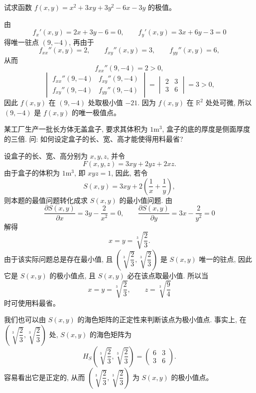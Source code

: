 \documentclass[12pt,fontset=fandol]{ctexart}
\begin{document}
\begin{example}\label{course-example-14-5-1}\quad 试求函数 $f(x,y)=x^2+3xy+3y^2-6x-3y$ 的极值。

\end{example}
\begin{solve}\quad 由
\[
  f_x'(x,y)=2x+3y-6=0,\qquad
  f_y'(x,y)=3x+6y-3=0
\]
得唯一驻点 $(9,-4)$, 再由于
\[
  f_{xx}''(x,y)=2,\qquad f_{xy}''(x,y)=3,\qquad f_{yy}''(x,y)=6,
\]
从而
\[
  f_{xx}''(9,-4)=2>0,
\]
\[
  \begin{vmatrix}
    f_{xx}''(9,-4) & f_{xy}''(9,-4)\\
    f_{xy}''(9,-4) & f_{yy}''(9,-4)
  \end{vmatrix}
  =
  \begin{vmatrix}
    2 & 3\\
    3 & 6
  \end{vmatrix}
  =3>0,
\]
因此 $f(x,y)$ 在 $(9,-4)$ 处取极小值 $-21$. 因为 $f(x,y)$ 在 $\mathbb R^2$ 处处可微, 所以 $(9,-4)$ 是 $f(x,y)$ 的唯一极值点。

\end{solve}
\begin{example}\label{course-example-14-5-2}\quad 某工厂生产一批长方体无盖盒子, 要求其体积为 $1\mathrm{m}^3$, 盒子的底的厚度是侧面厚度的三倍. 问: 如何设定盒子的长、宽、高才能使得用料最省?

\end{example}
\begin{solve}\quad 设盒子的长、宽、高分别为 $x,y,z$, 并令
\[
  F(x,y,z)=3xy+2yz+2xz.
\]
由于盒子的体积为 $1\mathrm{m}^3$, 即 $xyz=1$, 因此, 若令
\[
  S(x,y)=3xy+2\left(\frac1x+\frac1y\right),
\]
则本题的最值问题转化成求 $S(x,y)$ 的最小值问题. 由
\[
  \frac{\partial S(x,y)}{\partial x}=3y-\frac2{x^2}=0,\qquad
  \frac{\partial S(x,y)}{\partial y}=3x-\frac2{y^2}=0
\]
解得
\[
  x=y=\sqrt[3]{\frac23}.
\]
由于该实际问题总是存在最小值, 且 $\left(\sqrt[3]{\dfrac23},\sqrt[3]{\dfrac23}\right)$ 是 $S(x,y)$ 唯一的驻点, 因此它是 $S(x,y)$ 的极小值点, 且 $S(x,y)$ 必在该点取最小值. 所以当
\[
  x=y=\sqrt[3]{\frac23},\qquad z=\sqrt[3]{\frac94}
\]
时可使用料最省。

我们也可以由 $S(x,y)$ 的海色矩阵的正定性来判断该点为极小值点. 事实上, 在 $\left(\sqrt[3]{\dfrac23},\sqrt[3]{\dfrac23}\right)$ 处, $S(x,y)$ 的海色矩阵为
\[
  H_S\left(\sqrt[3]{\frac23},\sqrt[3]{\frac23}\right)
  =
  \begin{pmatrix}
    6 & 3\\
    3 & 6
  \end{pmatrix}.
\]
容易看出它是正定的, 从而 $\left(\sqrt[3]{\dfrac23},\sqrt[3]{\dfrac23}\right)$ 为 $S(x,y)$ 的极小值点。

\end{solve}
\end{document}
